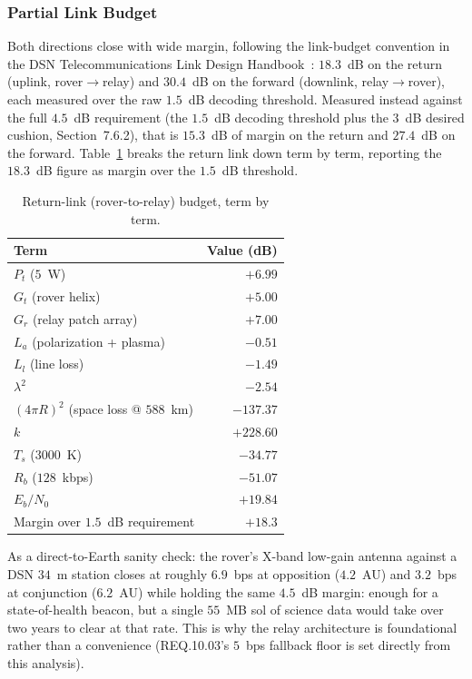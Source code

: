 \documentclass[11pt]{article}
\begin{document}
\subsubsection{Partial Link Budget}
Both directions close with wide margin, following the link-budget convention in the DSN
Telecommunications Link Design Handbook~\cite{dsnHandbook}: $18.3$~dB on the return (uplink,
rover$\to$relay) and $30.4$~dB on the forward (downlink, relay$\to$rover), each measured over the
raw $1.5$~dB decoding threshold. Measured instead against the full $4.5$~dB requirement (the
$1.5$~dB decoding threshold plus the $3$~dB desired cushion, Section~7.6.2), that is $15.3$~dB of
margin on the return and $27.4$~dB on the forward. Table~\ref{tab:link-budget} breaks the return
link down term by term, reporting the $18.3$~dB figure as margin over the $1.5$~dB threshold.

\begin{table}[H]
\centering
\small
\begin{tabular}{lr}
\toprule
\textbf{Term} & \textbf{Value (dB)} \\
\midrule
$P_t$ ($5$~W) & $+6.99$ \\
$G_t$ (rover helix) & $+5.00$ \\
$G_r$ (relay patch array) & $+7.00$ \\
$L_a$ (polarization + plasma) & $-0.51$ \\
$L_l$ (line loss) & $-1.49$ \\
$\lambda^2$ & $-2.54$ \\
$(4\pi R)^2$ (space loss @ $588$~km) & $-137.37$ \\
$k$ & $+228.60$ \\
$T_s$ ($3000$~K) & $-34.77$ \\
$R_b$ ($128$~kbps) & $-51.07$ \\
\midrule
$E_b/N_0$ & $\mathbf{+19.84}$ \\
Margin over $1.5$~dB requirement & $\mathbf{+18.3}$ \\
\bottomrule
\end{tabular}
\caption{Return-link (rover-to-relay) budget, term by term.}
\label{tab:link-budget}
\end{table}

As a direct-to-Earth sanity check: the rover's X-band low-gain antenna against a DSN
$34$~m station closes at roughly $6.9$~bps at opposition ($4.2$~AU) and $3.2$~bps at conjunction
($6.2$~AU) while holding the same $4.5$~dB margin: enough for a state-of-health beacon, but a
single $55$~MB sol of science data would take over two years to clear at that rate. This is why
the relay architecture is foundational rather than a convenience (REQ.10.03's $5$~bps fallback
floor is set directly from this analysis).
\end{document}
